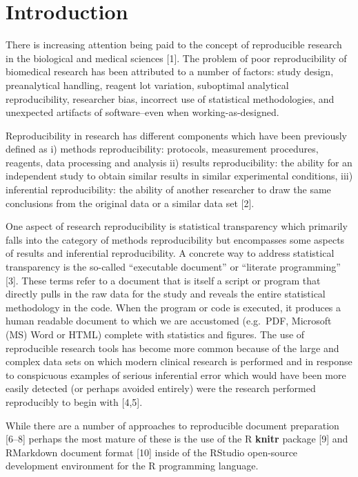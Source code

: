 \documentclass[]{elsarticle} %
\begin{document}
\hypertarget{introduction}{%
\section{Introduction}\label{introduction}}

There is increasing attention being paid to the concept of reproducible
research in the biological and medical sciences {[}1{]}. The problem of
poor reproducibility of biomedical research has been attributed to a
number of factors: study design, preanalytical handling, reagent lot
variation, suboptimal analytical reproducibility, researcher bias,
incorrect use of statistical methodologies, and unexpected artifacts of
software--even when working-as-designed.

Reproducibility in research has different components which have been
previously defined as i) methods reproducibility: protocols, measurement
procedures, reagents, data processing and analysis ii) results
reproducibility: the ability for an independent study to obtain similar
results in similar experimental conditions, iii) inferential
reproducibility: the ability of another researcher to draw the same
conclusions from the original data or a similar data set {[}2{]}.

One aspect of research reproducibility is statistical transparency which
primarily falls into the category of methods reproducibility but
encompasses some aspects of results and inferential reproducibility. A
concrete way to address statistical transparency is the so-called
``executable document'' or ``literate programming'' {[}3{]}. These terms
refer to a document that is itself a script or program that directly
pulls in the raw data for the study and reveals the entire statistical
methodology in the code. When the program or code is executed, it
produces a human readable document to which we are accustomed (e.g.~PDF,
Microsoft (MS) Word or HTML) complete with statistics and figures. The
use of reproducible research tools has become more common because of the
large and complex data sets on which modern clinical research is
performed and in response to conspicuous examples of serious inferential
error which would have been more easily detected (or perhaps avoided
entirely) were the research performed reproducibly to begin with
{[}4,5{]}.

While there are a number of approaches to reproducible document
preparation {[}6--8{]} perhaps the most mature of these is the use of
the R \textbf{knitr} package {[}9{]} and RMarkdown document format
{[}10{]} inside of the RStudio open-source development environment for
the R programming language.
\end{document}
